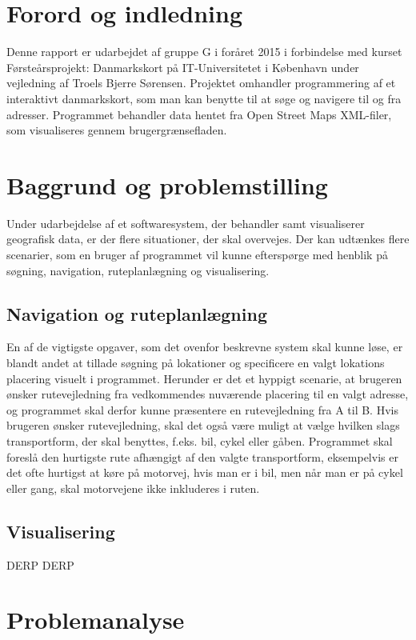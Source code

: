 \documentclass[a4paper]{article}
\begin{document}
\section{Forord og indledning}
Denne rapport er udarbejdet af gruppe G i foråret 2015 i forbindelse med kurset Førsteårsprojekt: Danmarkskort på IT-Universitetet i København under vejledning af Troels Bjerre Sørensen. Projektet omhandler programmering af et interaktivt danmarkskort, som man kan benytte til at søge og navigere til og fra adresser. Programmet behandler data hentet fra Open Street Maps XML-filer, som visualiseres gennem brugergrænsefladen. 

\section{Baggrund og problemstilling}
Under udarbejdelse af et softwaresystem, der behandler samt visualiserer geografisk data, er der flere situationer, der skal overvejes. Der kan udtænkes flere scenarier, som en bruger af programmet vil kunne efterspørge med henblik på søgning, navigation, ruteplanlægning og visualisering. 

\subsection{Navigation og ruteplanlægning}
En af de vigtigste opgaver, som det ovenfor beskrevne  system skal kunne løse, er blandt andet at tillade søgning på lokationer og specificere en valgt lokations placering  visuelt i programmet. Herunder er det et hyppigt scenarie, at brugeren ønsker rutevejledning fra vedkommendes nuværende placering til en valgt adresse, og programmet skal derfor kunne præsentere en rutevejledning fra A til B. Hvis brugeren ønsker rutevejledning, skal det også være muligt at vælge hvilken slags transportform, der skal benyttes, f.eks. bil, cykel eller gåben. 
Programmet skal foreslå den hurtigste rute afhængigt af den valgte transportform, eksempelvis er det ofte hurtigst at køre på motorvej, hvis man er i bil, men når man er på cykel eller gang, skal motorvejene ikke inkluderes i ruten.

\subsection{Visualisering}
DERP DERP

\section{Problemanalyse}
\end{document}

